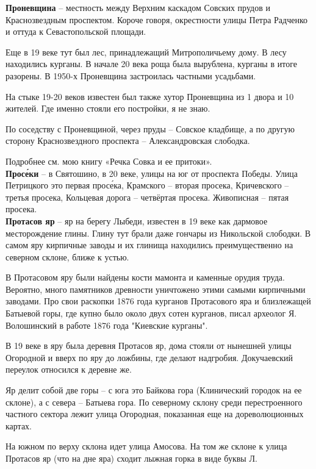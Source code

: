 \textbf{Проневщина} – местность между Верхним каскадом Совских прудов и Краснозвездным проспектом. Короче говоря, окрестности улицы Петра Радченко и оттуда к Севастопольской площади.

Еще в 19 веке тут был лес, принадлежащий Митрополичьему дому. В лесу находились курганы. В начале 20 века роща была вырублена, курганы в итоге разорены. В 1950-х Проневщина застроилась частными усадьбами.

На стыке 19-20 веков известен был также хутор Проневщина из 1 двора и 10 жителей. Где именно стояли его постройки, я не знаю.

По соседству с Проневщиной, через пруды – Совское кладбище, а по другую сторону Краснозвездного проспекта – Александровская слободка. 

Подробнее см. мою книгу «Речка Совка и ее притоки».\\

\textbf{Прос\'еки} – в Святошино, в 20 веке, улицы на юг от проспекта Победы. Улица Петрицкого это первая прос\'ека, Крамского – вторая просека, Кричевского – третья просека, Кольцевая дорога – четвёртая просека. Живописная – пятая просека.\\

\textbf{Протасов яр} – яр на берегу Лыбеди, известен в 19 веке как дармовое месторождение глины. Глину тут брали даже гончары из Никольской слободки. В самом яру кирпичные заводы и их глинища находились преимущественно на северном склоне, ближе к устью.

В Протасовом яру были найдены кости мамонта и каменные орудия труда. Вероятно, много памятников древности уничтожено этими самыми кирпичными заводами. Про свои раскопки 1876 года курганов Протасового яра и близлежащей Батыевой горы, где купно было около двух сотен курганов, писал археолог Я. Волошинский в работе 1876 года "Киевские курганы".

В 19 веке в яру была деревня Протасов яр, дома стояли от нынешней улицы Огородной и вверх по яру до ложбины, где делают надгробия. Докучаевский переулок относился к деревне же.

Яр делит собой две горы – с юга это Байкова гора (Клинический городок на ее склоне), а с севера – Батыева гора. По северному склону среди перестроенного частного сектора лежит улица Огородная, показанная еще на дореволюционных картах. 

На южном по верху склона идет улица Амосова. На том же склоне к улица Протасов яр (что на дне яра) сходит лыжная горка в виде буквы Л.

